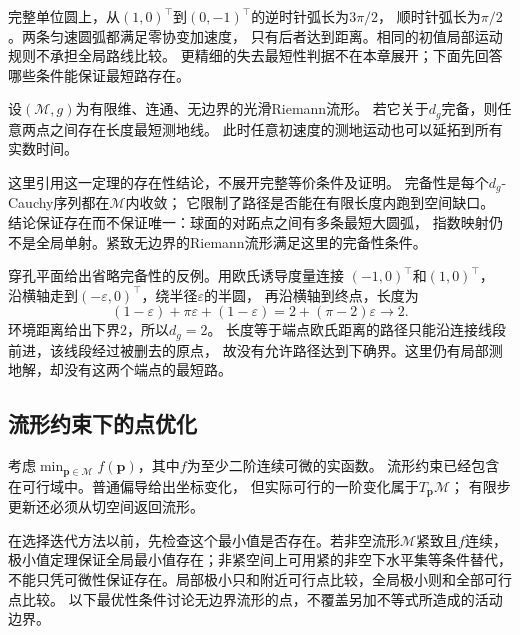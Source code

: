 完整单位圆上，从$(1,0)^\top$到$(0,-1)^\top$的逆时针弧长为$3\pi/2$，
顺时针弧长为$\pi/2$。两条匀速圆弧都满足零协变加速度，
只有后者达到距离。相同的初值局部运动规则不承担全局路线比较。
更精细的失去最短性判据不在本章展开；下面先回答哪些条件能保证最短路存在。

\begin{theorem}
\label{thm:geometry-hopf-rinow-existence}
设$(\mathcal M,g)$为有限维、连通、无边界的光滑Riemann流形。
若它关于$d_g$完备，则任意两点之间存在长度最短测地线。
此时任意初速度的测地运动也可以延拓到所有实数时间。
\end{theorem}
这里引用这一定理的存在性结论，不展开完整等价条件及证明。
完备性是每个$d_g$-Cauchy序列都在$\mathcal M$内收敛；
它限制了路径是否能在有限长度内跑到空间缺口。
结论保证存在而不保证唯一：球面的对跖点之间有多条最短大圆弧，
指数映射仍不是全局单射。紧致无边界的Riemann流形满足这里的完备性条件。

穿孔平面给出省略完备性的反例。用欧氏诱导度量连接
$(-1,0)^\top$和$(1,0)^\top$，
沿横轴走到$(-\varepsilon,0)^\top$，绕半径$\varepsilon$的半圆，
再沿横轴到终点，长度为
\[
 (1-\varepsilon)+\pi\varepsilon+(1-\varepsilon)
 =2+(\pi-2)\varepsilon\longrightarrow2.
\]
环境距离给出下界$2$，所以$d_g=2$。
长度等于端点欧氏距离的路径只能沿连接线段前进，该线段经过被删去的原点，
故没有允许路径达到下确界。这里仍有局部测地解，却没有这两个端点的最短路。

\subsection{流形约束下的点优化}
\label{sec:geometry-point-optimization}
\label{sec:geometry-manifold-optimization}
\label{sec:geometry-point-optimality}

考虑$\min_{\bm p\in\mathcal M}f(\bm p)$，其中$f$为至少二阶连续可微的实函数。
流形约束已经包含在可行域中。普通偏导给出坐标变化，
但实际可行的一阶变化属于$T_{\bm p}\mathcal M$；
有限步更新还必须从切空间返回流形。


在选择迭代方法以前，先检查这个最小值是否存在。若非空流形$\mathcal M$紧致且$f$连续，
极小值定理保证全局最小值存在；非紧空间上可用紧的非空下水平集等条件替代，
不能只凭可微性保证存在。局部极小只和附近可行点比较，全局极小则和全部可行点比较。
以下最优性条件讨论无边界流形的点，不覆盖另加不等式所造成的活动边界。

